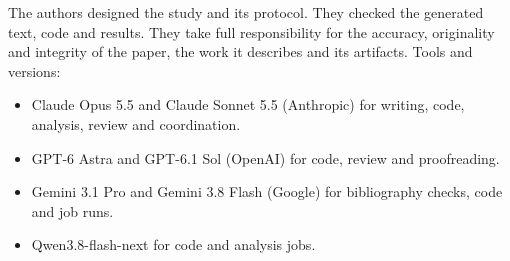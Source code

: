 The authors designed the study and its protocol.
They checked the generated text, code and results.
They take full responsibility for the accuracy, originality and integrity of the paper, the work it describes and its artifacts.
Tools and versions:
\begin{itemize}
\item Claude Opus 5.5 and Claude Sonnet 5.5 (Anthropic) for writing, code, analysis, review and coordination.
\item GPT-6 Astra and GPT-6.1 Sol (OpenAI) for code, review and proofreading.
\item Gemini 3.1 Pro and Gemini 3.8 Flash (Google) for bibliography checks, code and job runs.
\item Qwen3.8-flash-next for code and analysis jobs.
\end{itemize}
